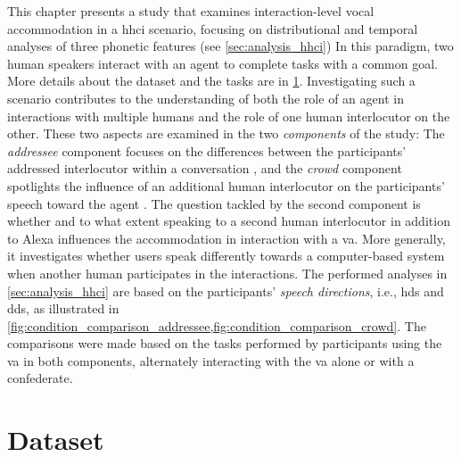 This chapter presents a study that examines interaction-level vocal accommodation in a \acf{hhci} scenario, focusing on distributional and temporal analyses of three phonetic features (see \cref{sec:analysis_hhci})
In this paradigm, two human speakers interact with an agent to complete tasks with a common goal.
More details about the dataset and the tasks are in \cref{sec:vacc}.
Investigating such a scenario contributes to the understanding of both the role of an agent in interactions with multiple humans and the role of one human interlocutor on the other.
These two aspects are examined in the two \emph{components} of the study:
The \emph{addressee} component focuses on the differences between the participants' addressed interlocutor within a conversation \citep[][see]{Raveh2019ESSV}, and the \emph{crowd} component spotlights the influence of an additional human interlocutor on the participants' speech toward the agent \citep[see][]{Raveh2019InterspeechAlexa}.
The question tackled by the second component is whether and to what extent speaking to a second human interlocutor in addition to Alexa influences the accommodation in interaction with a \ac{va}.
More generally, it investigates whether users speak differently towards a computer-based system when another human participates in the interactions.
The performed analyses in \cref{sec:analysis_hhci} are based on the participants' \emph{speech directions}, i.e., \acf{hds} and \acf{dds}, as illustrated in \cref{fig:condition_comparison_addressee,fig:condition_comparison_crowd}.
The comparisons were made based on the tasks performed by participants using the \ac{va} in both components, alternately interacting with the \ac{va} alone or with a confederate.

\section[The voice assistant conversation corpus]{Dataset} %
\label{sec:vacc}

